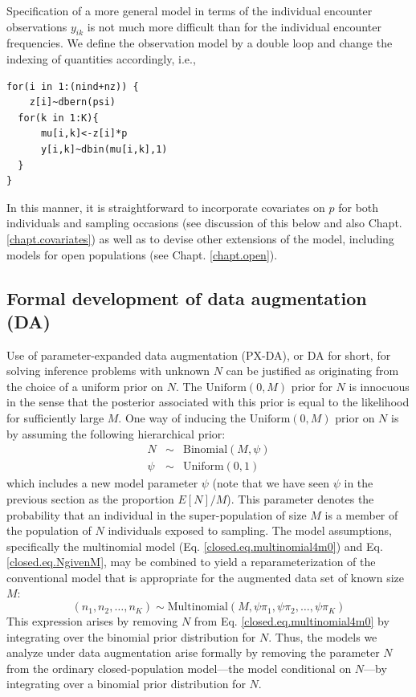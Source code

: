 Specification of a more general model in terms of the individual
encounter observations $y_{ik}$ is not much more difficult than for
the individual encounter frequencies.  We define the
observation model by a double loop and change the indexing of quantities
accordingly, i.e.,
{\small
\begin{verbatim}
for(i in 1:(nind+nz)) {
    z[i]~dbern(psi)
  for(k in 1:K){
      mu[i,k]<-z[i]*p
      y[i,k]~dbin(mu[i,k],1)
  }
}
\end{verbatim}
}
In this manner, it is straightforward to incorporate covariates on $p$
for both individuals and sampling occasions
(see discussion of this below and also Chapt. \ref{chapt.covariates})
as well as to devise other extensions of the model, including models
for open populations (see Chapt. \ref{chapt.open}).

\subsection{Formal development of data augmentation (DA) }

Use of parameter-expanded data augmentation (PX-DA), or DA for short, for solving inference problems with unknown $N$ can be
justified as originating from the choice of a uniform prior on $N$.  The
$\mathrm{Uniform}(0,M)$ prior for $N$ is innocuous in the sense that the
posterior associated with this prior is equal to the likelihood for
sufficiently large $M$.  One way of inducing the $\mathrm{Uniform}(0,M)$
prior on $N$ is by assuming the following hierarchical prior:
\begin{eqnarray}
\label{closed.eq.NgivenM}
  N &\sim& \mathrm{Binomial}(M, \psi) \\ \nonumber
  \psi &\sim& \mathrm{Uniform}(0,1)
\end{eqnarray}
which includes a new model parameter $\psi$
(note that we have seen $\psi$ in the previous section as the proportion $E[N]/M$).
This parameter denotes
the probability that an individual in the super-population of size $M$
is a member of the population of $N$ individuals exposed to sampling.
The model assumptions, specifically the multinomial model
(Eq. \ref{closed.eq.multinomial4m0})
and Eq. \ref{closed.eq.NgivenM}, may be combined to yield a
reparameterization of the conventional model that is appropriate for
the augmented data set of known size $M$:
\begin{equation}
\label{closed.eq.multinomial4DA}
    (n_1, n_2, \ldots, n_K) \sim \mathrm{Multinomial}(M, \psi  \pi_{1}, \psi \pi_{2}, \ldots, \psi \pi_{K})
\end{equation}
This expression arises by removing $N$ from Eq. \ref{closed.eq.multinomial4m0} by
integrating
over the binomial prior distribution for $N$. Thus, the models we
analyze under data augmentation arise formally by removing the
parameter $N$ from the ordinary closed-population model---the model
conditional on $N$---by integrating over a binomial prior distribution
for $N$.

